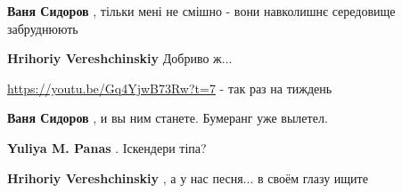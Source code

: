 \begin{itemize}
\begin{itemize}
\begin{itemize}
 
\textbf{Ваня Сидоров} , тільки мені не смішно - вони навколишнє середовище забруднюють

 
\textbf{Hrihoriy Vereshchinskiy} Добриво ж...

 
\url{https://youtu.be/Gq4YjwB73Rw?t=7} - так раз на тиждень


 
\textbf{Ваня Сидоров} , и вы ним станете. Бумеранг уже вылетел.

 
\textbf{Yuliya M. Panas} . Іскендери тіпа?

\end{itemize}


 
\textbf{Hrihoriy Vereshchinskiy} , а у нас песня... в своём глазу ищите

\begin{itemize}
 

\end{itemize}
\end{itemize}
\end{itemize}
